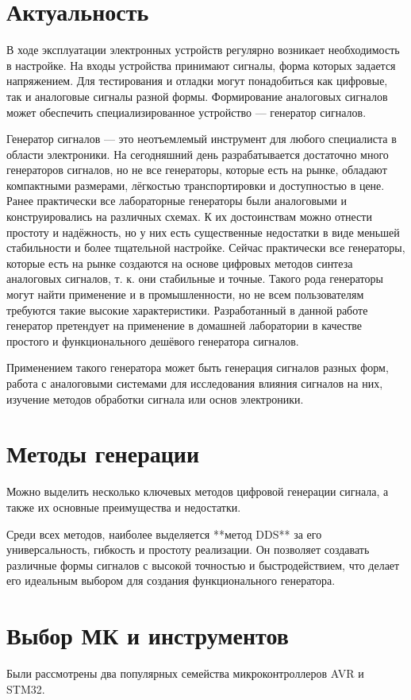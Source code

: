 \documentclass[a4paper, 14pt]{extarticle}
\begin{document}
\section*{Актуальность}
	В ходе эксплуатации электронных устройств регулярно возникает необходимость в настройке. На входы устройства принимают сигналы, форма которых задается напряжением. Для тестирования и отладки могут понадобиться как цифровые, так и аналоговые сигналы разной формы. Формирование аналоговых сигналов может обеспечить специализированное устройство --- генератор сигналов.
	
	Генератор сигналов --- это неотъемлемый инструмент для любого специалиста в области электроники. На сегодняшний день разрабатывается достаточно много генераторов сигналов, но не все генераторы, которые есть на рынке, обладают компактными размерами, лёгкостью транспортировки и доступностью в цене. 
	Ранее практически все лабораторные генераторы были аналоговыми и конструировались на различных схемах. К их достоинствам можно отнести простоту и надёжность, но у них есть существенные недостатки в виде меньшей стабильности и более тщательной настройке. Сейчас практически все генераторы, которые есть на рынке создаются на основе цифровых методов синтеза аналоговых сигналов, т. к. они стабильные и точные.  
	 Такого рода генераторы могут найти применение и в промышленности, но не всем пользователям требуются такие высокие характеристики. Разработанный в данной работе генератор претендует на применение в домашней лаборатории в качестве простого и функционального дешёвого генератора сигналов.
	
	Применением такого генератора может быть генерация сигналов разных форм, работа с аналоговыми системами для исследования влияния сигналов на них, изучение методов обработки сигнала или основ электроники. 

\section*{Методы генерации}
Можно выделить несколько ключевых методов цифровой генерации сигнала, а также их основные преимущества и недостатки.

Среди всех методов, наиболее выделяется **метод DDS** за его универсальность,
 гибкость и простоту реализации. Он позволяет создавать различные формы сигналов
 с высокой точностью и быстродействием, что делает его идеальным выбором для создания функционального генератора.



\section*{Выбор МК и инструментов}
	Были рассмотрены два популярных семейства микроконтроллеров AVR и STM32.
	
\end{document}
